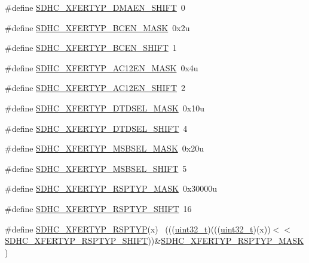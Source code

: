 \begin{DoxyCompactItemize}
\item 
\#define \hyperlink{group___s_d_h_c___register___masks_ga5cecfd8f158b456d3a2a9ea7820117b2}{S\+D\+H\+C\+\_\+\+X\+F\+E\+R\+T\+Y\+P\+\_\+\+D\+M\+A\+E\+N\+\_\+\+S\+H\+I\+FT}~0
\item 
\#define \hyperlink{group___s_d_h_c___register___masks_ga1d7dcef14285859fb5f204d71d2083cc}{S\+D\+H\+C\+\_\+\+X\+F\+E\+R\+T\+Y\+P\+\_\+\+B\+C\+E\+N\+\_\+\+M\+A\+SK}~0x2u
\item 
\#define \hyperlink{group___s_d_h_c___register___masks_ga25223c582d559cd31d3de92191c681c7}{S\+D\+H\+C\+\_\+\+X\+F\+E\+R\+T\+Y\+P\+\_\+\+B\+C\+E\+N\+\_\+\+S\+H\+I\+FT}~1
\item 
\#define \hyperlink{group___s_d_h_c___register___masks_ga1940add41a5918da9c0b045597e0c497}{S\+D\+H\+C\+\_\+\+X\+F\+E\+R\+T\+Y\+P\+\_\+\+A\+C12\+E\+N\+\_\+\+M\+A\+SK}~0x4u
\item 
\#define \hyperlink{group___s_d_h_c___register___masks_ga2e8fdd12bcab3fa4d4e6823eabaf65a0}{S\+D\+H\+C\+\_\+\+X\+F\+E\+R\+T\+Y\+P\+\_\+\+A\+C12\+E\+N\+\_\+\+S\+H\+I\+FT}~2
\item 
\#define \hyperlink{group___s_d_h_c___register___masks_ga608ac3efa7417c8763511d336a8cb6c7}{S\+D\+H\+C\+\_\+\+X\+F\+E\+R\+T\+Y\+P\+\_\+\+D\+T\+D\+S\+E\+L\+\_\+\+M\+A\+SK}~0x10u
\item 
\#define \hyperlink{group___s_d_h_c___register___masks_ga669da614be8810a42499b583e2ce2617}{S\+D\+H\+C\+\_\+\+X\+F\+E\+R\+T\+Y\+P\+\_\+\+D\+T\+D\+S\+E\+L\+\_\+\+S\+H\+I\+FT}~4
\item 
\#define \hyperlink{group___s_d_h_c___register___masks_gafb2312829ed2798040e4b2b0f17a0114}{S\+D\+H\+C\+\_\+\+X\+F\+E\+R\+T\+Y\+P\+\_\+\+M\+S\+B\+S\+E\+L\+\_\+\+M\+A\+SK}~0x20u
\item 
\#define \hyperlink{group___s_d_h_c___register___masks_ga9f13f1a35f73d15da1cb2e89a6919e30}{S\+D\+H\+C\+\_\+\+X\+F\+E\+R\+T\+Y\+P\+\_\+\+M\+S\+B\+S\+E\+L\+\_\+\+S\+H\+I\+FT}~5
\item 
\#define \hyperlink{group___s_d_h_c___register___masks_ga0ed8f044a988ab8f1017f9f17c6087a5}{S\+D\+H\+C\+\_\+\+X\+F\+E\+R\+T\+Y\+P\+\_\+\+R\+S\+P\+T\+Y\+P\+\_\+\+M\+A\+SK}~0x30000u
\item 
\#define \hyperlink{group___s_d_h_c___register___masks_gabcc1b92e4008ae1b4b0ad594d09906c1}{S\+D\+H\+C\+\_\+\+X\+F\+E\+R\+T\+Y\+P\+\_\+\+R\+S\+P\+T\+Y\+P\+\_\+\+S\+H\+I\+FT}~16
\item 
\#define \hyperlink{group___s_d_h_c___register___masks_gaec81c7e2d355ea253d1e860076eecfb9}{S\+D\+H\+C\+\_\+\+X\+F\+E\+R\+T\+Y\+P\+\_\+\+R\+S\+P\+T\+YP}(x)                                  ~(((\hyperlink{_p_e___types_8h_a33594304e786b158f3fb30289278f5af}{uint32\+\_\+t})(((\hyperlink{_p_e___types_8h_a33594304e786b158f3fb30289278f5af}{uint32\+\_\+t})(x))$<$$<$\hyperlink{group___s_d_h_c___register___masks_gabcc1b92e4008ae1b4b0ad594d09906c1}{S\+D\+H\+C\+\_\+\+X\+F\+E\+R\+T\+Y\+P\+\_\+\+R\+S\+P\+T\+Y\+P\+\_\+\+S\+H\+I\+FT}))\&\hyperlink{group___s_d_h_c___register___masks_ga0ed8f044a988ab8f1017f9f17c6087a5}{S\+D\+H\+C\+\_\+\+X\+F\+E\+R\+T\+Y\+P\+\_\+\+R\+S\+P\+T\+Y\+P\+\_\+\+M\+A\+SK})
$$
\end{DoxyCompactItemize}
